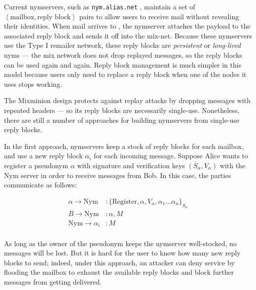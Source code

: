 \documentclass[times,10pt,twocolumn]{article}
\newcommand\emailaddr{\begingroup \def\UrlLeft{<}\def\UrlRight{>}\urlstyle{tt}\Url}
\begin{document}


\label{sec:nymservers}

Current nymservers, such as {\tt nym.alias.net} \cite{nym-alias-net},
maintain a set of $\left<\mbox{mailbox}, \mbox{reply block}\right>$ 
pairs to allow users to
receive mail without revealing their identities. When mail arrives to
\emailaddr{bob@nym.alias.net}, the nymserver attaches the payload to
the associated
reply block and sends it off into the mix-net. Because these nymservers
use the Type I remailer network, these reply blocks are \emph{persistent}
or \emph{long-lived} nyms --- the mix network does not drop replayed
messages, so the reply blocks can be used again and again. Reply block
management is much simpler in this model because users only need to
replace a reply block when one of the nodes it uses stops working.

The Mixminion design protects against replay attacks by dropping messages
with repeated headers --- so its reply blocks are necessarily
single-use. Nonetheless, there are still a number of approaches for building
nymservers from single-use reply blocks.

In the first approach, nymservers keep a stock of reply blocks for
each mailbox, and use a new reply block $\alpha_i$ for each incoming message. 
Suppose Alice wants to register a pseudonym $\alpha$ with signature and
verification keys $(S_\alpha,V_\alpha)$ with the Nym server in order
to receive messages from Bob.  In this case, the parties communicate as
follows: 

\begin{equation}
\begin{aligned}
\alpha \rightarrow \mathrm{Nym}&: \{\mathrm{Register} , \alpha, V_{\alpha}, \alpha_1 \dots
\alpha_n\}_{S_\alpha} \\ 
B \rightarrow \mathrm{Nym}&: \alpha, M \\ 
\mathrm{Nym} \rightarrow \alpha_i&: M \\
\end{aligned}
\end{equation}

As long
as the owner of the pseudonym keeps the nymserver well-stocked, no
messages will be lost.  But it is hard for the user to know how many
new reply blocks to send; indeed, under this approach, an attacker can
deny service by flooding the mailbox to exhaust the available
reply blocks and block further messages from getting delivered.
\end{document}
